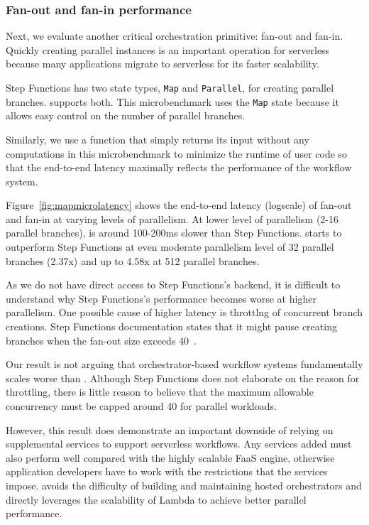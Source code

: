 \subsubsection{Fan-out and fan-in performance}\label{sec:eval-fan-out}

Next, we evaluate another critical orchestration primitive: fan-out and
fan-in. Quickly creating parallel instances is an important operation for
serverless because many applications migrate to serverless for its faster
scalability.

Step Functions has two state types, \texttt{Map} and \texttt{Parallel}, for creating
parallel branches. \name{} supports both. This microbenchmark uses the
\texttt{Map} state because it allows easy control on the number of parallel
branches.

Similarly, we use a function that simply returns its input without any
computations in this microbenchmark to minimize the runtime of user code so
that the end-to-end latency maximally reflects the performance of the workflow
system. 

Figure~\ref{fig:mapmicrolatency} shows the end-to-end latency (logscale) of
fan-out and fan-in at varying levels of parallelism. At lower level of
parallelism (2-16 parallel branches), \name{} is around 100-200ms slower than
Step Functions.  \name{} starts to outperform Step Functions at even moderate parallelism level of 32
parallel branches (2.37x) and up to 4.58x at 512 parallel branches. 

As we do not have direct access to Step Functions's backend, it is difficult to
understand why Step Functions's performance becomes worse at higher parallelism. One
possible cause of higher latency is throttlng of concurrent branch creations.
Step Functions documentation states that it might pause creating branches when the
fan-out size exceeds 40~\cite{aws-step-functions-map-state}.

Our result is not arguing that orchestrator-based workflow systems
fundamentally scales worse than \name{}. Although Step Functions does not
elaborate on the reason for throttling, there is little reason to believe that
the maximum allowable concurrency must be capped around 40 for parallel
workloads.

However, this result does demonstrate an important downside of relying on
supplemental services to support serverless workflows. Any services added must
also perform well compared with the highly scalable FaaS engine, otherwise
application developers have to work with the restrictions that the services
impose. \name{} avoids the difficulty of building and maintaining hosted
orchestrators and directly leverages the scalability of Lambda to achieve
better parallel performance.


